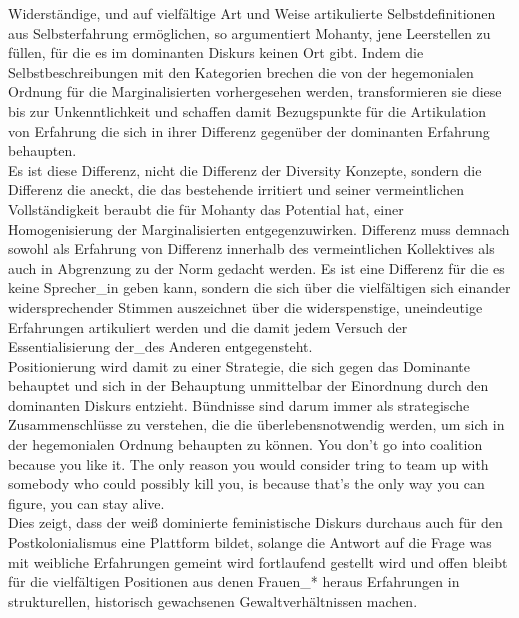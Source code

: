 Widerständige, und auf vielfältige Art und Weise artikulierte
Selbstdefinitionen aus Selbsterfahrung ermöglichen, so argumentiert Mohanty,
jene Leerstellen zu füllen, für die es im dominanten Diskurs keinen Ort gibt.
Indem die Selbstbeschreibungen mit den Kategorien brechen die von der
hegemonialen Ordnung für die Marginalisierten vorhergesehen werden,
transformieren sie diese bis zur Unkenntlichkeit und schaffen damit
Bezugspunkte für die Artikulation von Erfahrung die sich in ihrer Differenz
gegenüber der dominanten Erfahrung behaupten. \footnotemark
{}\\

\noindent Es ist diese Differenz, nicht die Differenz der Diversity Konzepte, sondern die
Differenz die aneckt, die das bestehende irritiert und seiner vermeintlichen
Vollständigkeit beraubt die für Mohanty das Potential hat, einer
Homogenisierung der Marginalisierten entgegenzuwirken. Differenz muss demnach
sowohl als Erfahrung von Differenz innerhalb des vermeintlichen Kollektives als
auch in Abgrenzung zu der Norm gedacht werden. Es ist eine Differenz für die es
keine Sprecher\_in geben kann, sondern die sich über die vielfältigen sich
einander widersprechender Stimmen \footnotemark {} auszeichnet über die widerspenstige,
uneindeutige Erfahrungen artikuliert werden und die damit jedem Versuch der
Essentialisierung der\_des Anderen entgegensteht. \\
Positionierung wird damit zu
einer Strategie, die sich gegen das Dominante behauptet und sich in der
Behauptung unmittelbar der Einordnung durch den dominanten Diskurs entzieht.
Bündnisse sind darum immer als strategische Zusammenschlüsse zu verstehen, die
die überlebensnotwendig werden, um sich in der hegemonialen Ordnung behaupten
zu können. \glqq You don't go into coalition because you like it. The only reason
you would consider tring to team up with somebody who could possibly kill you,
is because that's the only way you can figure, you can stay alive. \grqq
\footnotemark {}\\

\noindent Dies zeigt, dass der weiß dominierte feministische Diskurs durchaus auch für
den Postkolonialismus eine Plattform bildet, solange die Antwort auf die Frage
was mit weibliche Erfahrungen gemeint wird fortlaufend gestellt wird und offen
bleibt für die vielfältigen Positionen aus denen Frauen\_* heraus Erfahrungen
in strukturellen, historisch gewachsenen Gewaltverhältnissen machen.

